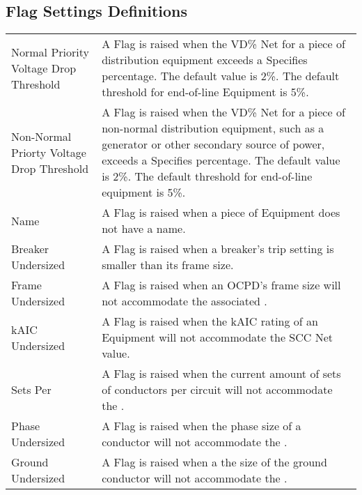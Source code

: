 \documentclass[letterpaper,10pt,english]{sphinxmanual}
\begin{document}
\subsection{Flag Settings Definitions}
\label{\detokenize{docs/definitions/index-definitions:flag-settings-definitions}}\label{\detokenize{docs/definitions/index-definitions:id2}}

\begin{savenotes}\sphinxattablestart
\centering
\begin{tabulary}{\linewidth}[t]{|T|T|}
\hline
\sphinxstyletheadfamily 
{}
&\sphinxstyletheadfamily 
{}
\\
\hline
Normal Priority Voltage Drop Threshold
&
A Flag is raised when the VD\% Net for a piece of distribution equipment exceeds a Specifies percentage.  The default value is 2\%.  The default threshold for end-of-line Equipment is 5\%.
\\
\hline
Non-Normal Priorty Voltage Drop Threshold
&
A Flag is raised when the VD\% Net for a piece of non-normal distribution equipment, such as a generator or other secondary source of power, exceeds a Specifies percentage.  The default value is 2\%.  The default threshold for end-of-line equipment is 5\%.
\\
\hline
Name
&
A Flag is raised when a piece of Equipment does not have a name.
\\
\hline
Breaker Undersized
&
A Flag is raised when a breaker’s trip setting is smaller than its frame size.
\\
\hline
Frame Undersized
&
A Flag is raised when an OCPD’s frame size will not accommodate the associated {\hyperref[\detokenize{docs/faq:load-capacity}]{}}.
\\
\hline
kAIC Undersized
&
A Flag is raised when the kAIC rating of an Equipment will not accommodate the SCC Net value.
\\
\hline
Sets Per
&
A Flag is raised when the current amount of sets of conductors per circuit will not accommodate the {\hyperref[\detokenize{docs/faq:load-capacity}]{}}.
\\
\hline
Phase Undersized
&
A Flag is raised when the phase size of a conductor will not accommodate the {\hyperref[\detokenize{docs/faq:load-capacity}]{}}.
\\
\hline
Ground Undersized
&
A Flag is raised when a the size of the ground conductor will not accommodate the {\hyperref[\detokenize{docs/faq:load-capacity}]{}}.

\end{tabulary}
\end{savenotes}
\end{document}

